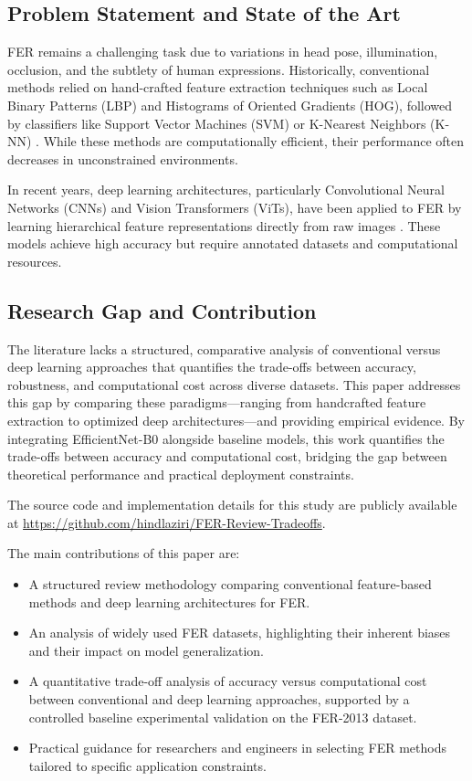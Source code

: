 \documentclass[pdflatex,sn-basic]{sn-jnl}
\theoremstyle{thmstyleone}
\theoremstyle{thmstyletwo}
\theoremstyle{thmstylethree}
\begin{document}
\subsection{Problem Statement and State of the Art}
FER remains a challenging task due to variations in head pose, illumination, occlusion, and the subtlety of human expressions. Historically, conventional methods relied on hand-crafted feature extraction techniques such as Local Binary Patterns (LBP) and Histograms of Oriented Gradients (HOG), followed by classifiers like Support Vector Machines (SVM) or K-Nearest Neighbors (K-NN) \cite{ref2}. While these methods are computationally efficient, their performance often decreases in unconstrained environments.

In recent years, deep learning architectures, particularly Convolutional Neural Networks (CNNs) and Vision Transformers (ViTs), have been applied to FER by learning hierarchical feature representations directly from raw images \cite{ref3, ref4}. These models achieve high accuracy but require annotated datasets and computational resources.

\subsection{Research Gap and Contribution}
The literature lacks a structured, comparative analysis of conventional versus deep learning approaches that quantifies the trade-offs between accuracy, robustness, and computational cost across diverse datasets. This paper addresses this gap by comparing these paradigms—ranging from handcrafted feature extraction to optimized deep architectures—and providing empirical evidence. By integrating EfficientNet-B0 alongside baseline models, this work quantifies the trade-offs between accuracy and computational cost, bridging the gap between theoretical performance and practical deployment constraints.

The source code and implementation details for this study are publicly available at \url{https://github.com/hindlaziri/FER-Review-Tradeoffs}.

The main contributions of this paper are:
\begin{itemize}
    \item A structured review methodology comparing conventional feature-based methods and deep learning architectures for FER.
    \item An analysis of widely used FER datasets, highlighting their inherent biases and their impact on model generalization.
    \item A quantitative trade-off analysis of accuracy versus computational cost between conventional and deep learning approaches, supported by a controlled baseline experimental validation on the FER-2013 dataset.
    \item Practical guidance for researchers and engineers in selecting FER methods tailored to specific application constraints.
\end{itemize}
\end{document}
